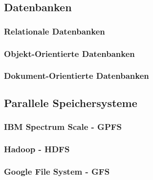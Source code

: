 \subsection{Datenbanken}

\subsubsection{Relationale Datenbanken}

\subsubsection{Objekt-Orientierte Datenbanken}

\subsubsection{Dokument-Orientierte Datenbanken}

\subsection{Parallele Speichersysteme}
\subsubsection{IBM Spectrum Scale - GPFS}
\subsubsection{Hadoop - HDFS}
\subsubsection{Google File System - GFS}